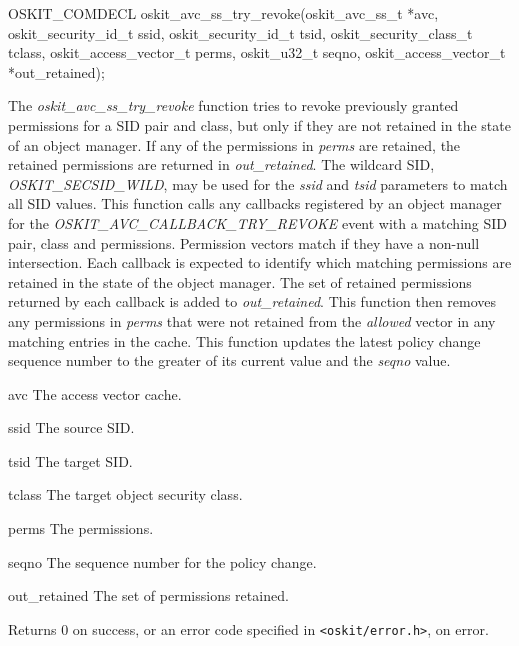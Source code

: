 \begin{apisyn}

	\funcproto OSKIT_COMDECL
	oskit_avc_ss_try_revoke(oskit_avc_ss_t *avc, 
		         oskit_security_id_t ssid,
			 oskit_security_id_t tsid,
                         oskit_security_class_t tclass,
			 oskit_access_vector_t perms,
			 oskit_u32_t seqno,
			 \outparam oskit_access_vector_t *out_retained);
\end{apisyn}
\begin{apidesc}

The \emph{oskit\_avc\_ss\_try\_revoke} function tries to revoke previously
granted permissions for a SID pair and class, but only if they are not
retained in the state of an object manager.  If any of the permissions
in \emph{perms} are retained, the retained permissions are returned in
\emph{out\_retained}.  The wildcard SID, \emph{OSKIT\_SECSID\_WILD}, may be
used for the \emph{ssid} and \emph{tsid} parameters to match all SID
values.  This function calls any callbacks registered by an object  
manager for the \emph{OSKIT\_AVC\_CALLBACK\_TRY\_REVOKE} event with a  
matching SID pair, class and permissions.  Permission vectors match if
they have a non-null intersection.  Each callback is expected to
identify which matching permissions are retained in the state
of the object manager.  The set of retained permissions 
returned by each callback is added to \emph{out\_retained}.  This
function then removes any permissions in \emph{perms} that were not
retained from the \emph{allowed} vector in any matching entries in the
cache.  This function updates the latest policy change sequence number
to the greater of its current value and the \emph{seqno} value.

\end{apidesc}
\begin{apiparm}
	\item[avc]
		The access vector cache.
	\item[ssid]
		The source SID.
	\item[tsid]
		The target SID.
	\item[tclass]
		The target object security class.
	\item[perms]
		The permissions.
	\item[seqno]
		The sequence number for the policy change.
	\item[out_retained]
		The set of permissions retained.
\end{apiparm}
\begin{apiret}
	Returns 0 on success, or an error code specified in
	{\tt <oskit/error.h>}, on error.
\end{apiret}


